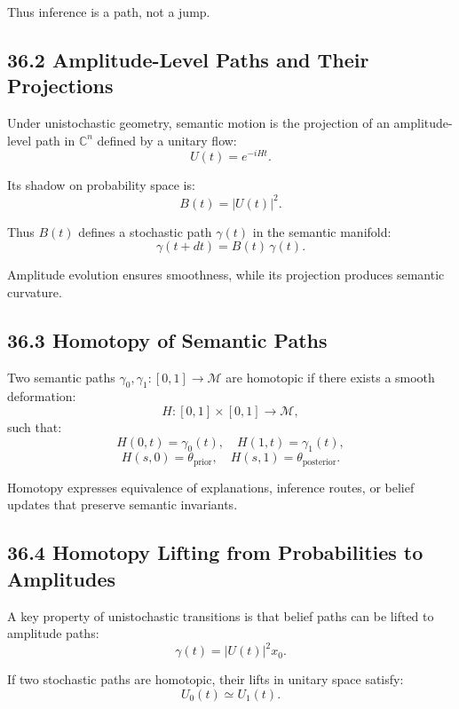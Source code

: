 \documentclass[12pt,letterpaper]{article}
\theoremstyle{remark}
\begin{document}
Thus inference is a path, not a jump.

\subsection{36.2 Amplitude-Level Paths and Their Projections}

Under unistochastic geometry, semantic motion is the projection of an amplitude-level path in $\mathbb{C}^n$ defined by a unitary flow:
\[
U(t) = e^{-iHt}.
\]

Its shadow on probability space is:
\[
B(t) = |U(t)|^2.
\]

Thus $B(t)$ defines a stochastic path $\gamma(t)$ in the semantic manifold:
\[
\gamma(t+dt) = B(t)\, \gamma(t).
\]

Amplitude evolution ensures smoothness, while its projection produces semantic curvature.

\subsection{36.3 Homotopy of Semantic Paths}

Two semantic paths $\gamma_0, \gamma_1 : [0,1]\to\mathcal{M}$ are homotopic if there exists a smooth deformation:
\[
H : [0,1]\times[0,1] \to \mathcal{M},
\]
such that:
\[
H(0,t)=\gamma_0(t), \quad H(1,t)=\gamma_1(t),
\]
\[
H(s,0)=\theta_\text{prior}, \quad H(s,1)=\theta_\text{posterior}.
\]

Homotopy expresses equivalence of explanations, inference routes, or belief updates that preserve semantic invariants.

\subsection{36.4 Homotopy Lifting from Probabilities to Amplitudes}

A key property of unistochastic transitions is that belief paths can be lifted to amplitude paths:
\[
\gamma(t) = |U(t)|^2 x_0.
\]

If two stochastic paths are homotopic, their lifts in unitary space satisfy:
\[
U_0(t) \simeq U_1(t).
\]
\end{document}
